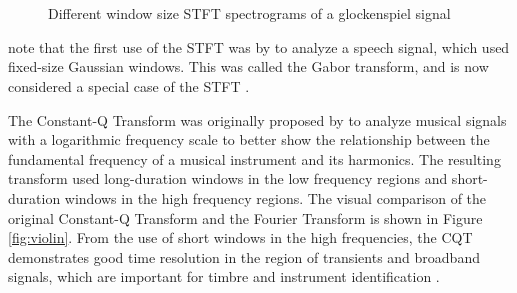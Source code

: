 \documentclass[report.tex]{subfiles}
\begin{document}
\begin{figure}[ht]
	\centering
	\\
	\\
	\caption{Different window size STFT spectrograms of a glockenspiel signal \parencite[1]{jaillet}}
	\label{fig:stfttradeoff}
\end{figure}

\textcite{dictionary} note that the first use of the STFT was by \textcite{gabor1946} to analyze a speech signal, which used fixed-size Gaussian windows. This was called the Gabor transform, and is now considered a special case of the STFT \parencite{dictionary}.

The Constant-Q Transform was originally proposed by \textcite{jbrown} to analyze musical signals with a logarithmic frequency scale to better show the relationship between the fundamental frequency of a musical instrument and its harmonics. The resulting transform used long-duration windows in the low frequency regions and short-duration windows in the high frequency regions. The visual comparison of the original Constant-Q Transform and the Fourier Transform is shown in Figure \ref{fig:violin}. From the use of short windows in the high frequencies, the CQT demonstrates good time resolution \parencite{cqtransient} in the region of transients and broadband signals, which are important for timbre and instrument identification \parencite{timbretransients1, timbretransients2}.
\end{document}

